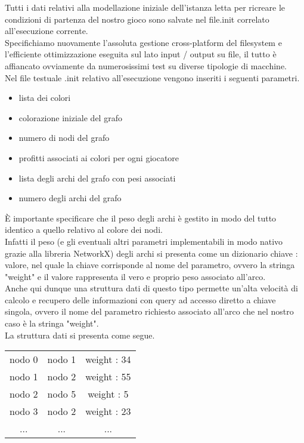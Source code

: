 Tutti i dati relativi alla modellazione iniziale dell'istanza letta per ricreare le condizioni di partenza del nostro gioco sono salvate nel file.init correlato all'esecuzione corrente.\\

Specifichiamo nuovamente l'assoluta gestione cross-platform del filesystem e l'efficiente ottimizzazione eseguita sul lato input / output su file, il tutto è affiancato ovviamente da numerosissimi test su diverse tipologie di macchine.\\

Nel file testuale .init relativo all'esecuzione vengono inseriti i seguenti parametri.

\begin{itemize}
	\item lista dei colori
	\item colorazione iniziale del grafo
	\item numero di nodi del grafo
	\item profitti associati ai colori per ogni giocatore
	\item lista degli archi del grafo con pesi associati
	\item numero degli archi del grafo
\end{itemize}

È importante specificare che il peso degli archi è gestito in modo del tutto identico a quello relativo al colore dei nodi.\\
Infatti il peso (e gli eventuali altri parametri implementabili in modo nativo grazie alla libreria NetworkX) degli archi si presenta come un dizionario chiave : valore, nel quale la chiave corrisponde al nome del parametro, ovvero la stringa "weight" e il valore rappresenta il vero e proprio peso associato all'arco.\\

Anche qui dunque una struttura dati di questo tipo permette un'alta velocità di calcolo e recupero delle informazioni con query ad accesso diretto a chiave singola, ovvero il nome del parametro richiesto associato all'arco che nel nostro caso è la stringa "weight".\\
La struttura dati si presenta come segue.

\begin{table}[h]
\centering
\begin{tabular}{ccc}
nodo 0 & nodo 1 & weight : 34 \\
nodo 1 & nodo 2 & weight : 55 \\
nodo 2 & nodo 5 & weight : 5 \\
nodo 3 & nodo 2 & weight : 23 \\
... & ... & ...
\end{tabular}
\end{table}

